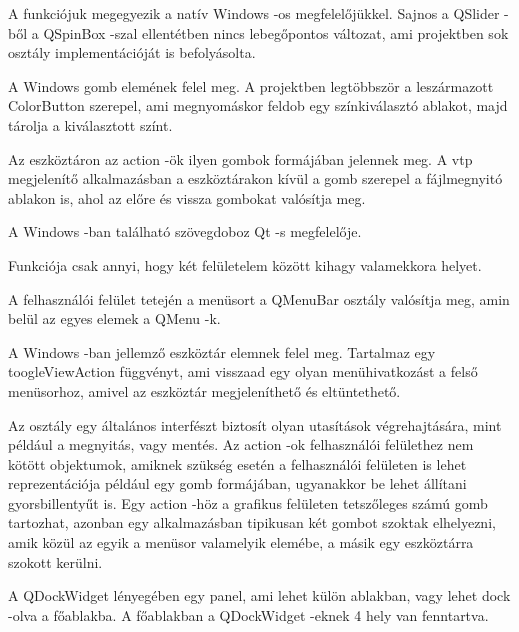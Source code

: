 \begin{sloppypar}
\begin{description}[font=\normalfont\itshape\bfseries\space]
\item [QLabel, QSlider, QSpinBox, QCheckBox, QComboBox:] 
A funkciójuk megegyezik a natív Windows -os megfelelőjükkel. 
Sajnos a QSlider -ből a QSpinBox -szal ellentétben nincs lebegőpontos változat, 
ami projektben sok osztály implementációját is befolyásolta.
\item [QPushButton:] 
A Windows gomb elemének felel meg. 
A projektben legtöbbször a leszármazott {\ttfamily ColorButton} szerepel, 
ami megnyomáskor feldob egy színkiválasztó ablakot, 
majd tárolja a kiválasztott színt.
\item [QToolButton:] 
Az eszköztáron az action -ök ilyen gombok formájában jelennek meg. 
A vtp megjelenítő alkalmazásban a eszköztárakon kívül 
a gomb szerepel a fájlmegnyitó ablakon is, 
ahol az előre és vissza gombokat valósítja meg.
\item [QLineEdit:] 
A Windows -ban található szövegdoboz Qt -s megfelelője.
\item [Spacer:] 
Funkciója csak annyi, hogy két felületelem között kihagy valamekkora helyet.
\item [QMenuBar, QMenu:] 
A felhasználói felület tetején a menüsort a {\ttfamily QMenuBar} osztály valósítja meg, 
amin belül az egyes elemek a {\ttfamily QMenu} -k.
\item [QToolBar:] A Windows -ban jellemző eszköztár elemnek felel meg. 
Tartalmaz egy {\ttfamily toogleViewAction} függvényt, 
ami visszaad egy olyan menühivatkozást a felső menüsorhoz, 
amivel az eszköztár megjeleníthető és eltüntethető.
\item [QAction:] 
Az osztály egy általános interfészt biztosít olyan utasítások végrehajtására, 
mint például a megnyitás, 
vagy mentés. 
Az action -ok felhasználói felülethez nem kötött objektumok, 
amiknek szükség esetén a felhasználói felületen is 
lehet reprezentációja például egy gomb formájában, 
ugyanakkor be lehet állítani gyorsbillentyűt is. 
Egy action -höz a grafikus felületen tetszőleges számú gomb tartozhat, 
azonban egy alkalmazásban tipikusan két gombot szoktak elhelyezni, 
amik közül az egyik a menüsor valamelyik elemébe, 
a másik egy eszköztárra szokott kerülni. 
\item [QDockWidget:] A {\ttfamily QDockWidget} lényegében egy panel, 
ami lehet külön ablakban, 
vagy lehet dock -olva a főablakba. 
A főablakban a {\ttfamily QDockWidget} -eknek 4 hely van fenntartva. 

\end{description}
\end{sloppypar}
